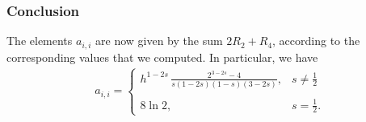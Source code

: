 {\subsubsection*{Conclusion}
The elements $a_{i,i}$ are now given by the sum $2R_2+R_4$, according to the corresponding values that we computed. In particular, we have 
\begin{align*}
	a_{i,i} = \begin{cases}
			\displaystyle h^{1-2s}\,\frac{2^{3-2s}-4}{s(1-2s)(1-s)(3-2s)}, & \displaystyle s\neq\frac{1}{2}
			\\
			\\
			8\ln 2, & \displaystyle s=\frac{1}{2}.			
			\end{cases}	
\end{align*}

}